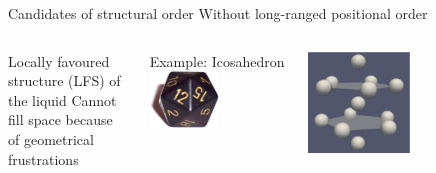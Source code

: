 \documentclass{beamer}
\begin{document}
\begin{frame}{Candidates of structural order}
\small{Without long-ranged positional order}
\begin{columns}
\begin{block}{Locally favoured structure (LFS) of the liquid}
Cannot fill space because of geometrical frustrations

\centering{}
\end{block}
Example: Icosahedron
\centering\includegraphics[width=0.5\textwidth]{d20.png}

\includegraphics[width=0.5\textwidth]{ico_13}
\end{columns}
\end{frame}
\end{document}
